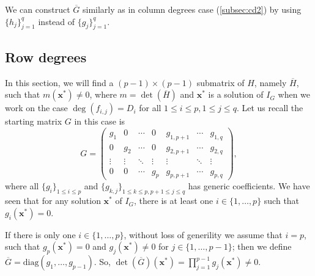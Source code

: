 \documentclass[11pt]{article}
\numberwithin{Property}{section}
\numberwithin{Theorem}{section}
\numberwithin{Proposition}{section}
\numberwithin{Lemma}{section}
\numberwithin{Corollary}{section}
\numberwithin{Definition}{section}
\numberwithin{Remark}{section}
\numberwithin{Conjecture}{section}
\numberwithin{Problem}{section}
\numberwithin{Example}{section}
\numberwithin{Claim}{section}
\renewcommand{\leq}{\leqslant}
\def\bar{\overline}
\newcommand{\todo}[1]{\textcolor{red}{#1}} %
\newcommand{\improve}[1]{\textcolor{blue}{#1}} %
\begin{document}
We can construct $\bar{G}$ similarly as in column degrees case (\improve{\cref{subsec:cd2}}) by using $\{h_j\}_{j=1}^q$ instead of $\{g_j\}_{j=1}^q$. 
\subsection{Row degrees}
\label{subsec:row2}
In this section, we will find a $(p-1)\times (p-1)$ submatrix of $H$, namely $\bar{H}$, such that $m(\mathbf{x}^*) \ne 0$, where $m = \det(\bar{H})$ and $\mathbf{x}^*$ is a solution of $I_G$ when we work on the case $\deg(f_{i,j}) = D_i$ for all $1 \leq i \leq p, 1\leq j \leq q$. Let us recall the starting matrix $G$ in this case is 
\[ G = \left( \begin{matrix}
g_1 & 0 & \cdots & 0 & g_{1,p+1} & \cdots & g_{1, q}\\
0 & g_2 & \cdots & 0 & g_{2,p+1} & \cdots & g_{2, q}\\
\vdots & \vdots & \ddots & \vdots & \vdots & \ddots & \vdots\\
0 & 0 & \cdots & g_p & g_{p,p+1} & \cdots & g_{p, q}
\end{matrix} \right), \] where all $\{g_i\}_{1 \leq i \leq p}$ and $\{g_{k,j}\}_{1 \leq k \leq p, p+1\leq j \leq q}$ has generic coefficients. We have seen that for any solution $\mathbf{x}^{*}$ of $I_G$, there is at least one $i \in \{1, \ldots , p\}$ such that $g_i(\mathbf{x}^*) = 0$. 

If there is only one $i \in \{1, \ldots, p\}$, without loss of generility we assume that $i=p$, such that $g_{p}(\mathbf{x}^*) = 0$ and $g_{j}(\mathbf{x}^*) \ne 0$ for $j \in \{1, \ldots, p-1\}$; then we define $\bar{G} = \mathrm{diag}(g_1, \ldots, g_{p-1})$. So, $\det(\bar{G})(\mathbf{x}^*) = \prod_{j=1}^{p-1}g_j(\mathbf{x}^*) \ne 0$.
\end{document}
